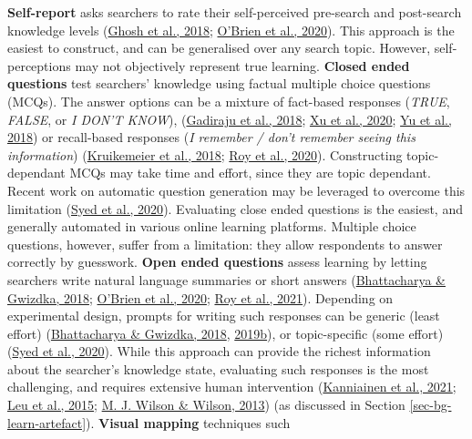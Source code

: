 \documentclass[letterpaper, nobind]{templates/ociamthesis}
\begin{document}
\textbf{Self-report} asks
searchers to rate their self-perceived pre-search and post-search
knowledge levels (\protect\hyperlink{ref-ghosh2018SearchingLearningExploring}{Ghosh et al., 2018}; \protect\hyperlink{ref-o2020role}{O'Brien et al., 2020}).
This approach is the easiest to construct, and can be generalised over
any search topic. However, self-perceptions may not objectively
represent true learning. \textbf{Closed ended questions} test searchers'
knowledge using factual multiple choice questions (MCQs). The answer
options can be a mixture of fact-based responses (\emph{TRUE}, \emph{FALSE}, or \emph{I
DON'T KNOW}),
(\protect\hyperlink{ref-gadiraju2018AnalyzingKnowledgeGain}{Gadiraju et al., 2018}; \protect\hyperlink{ref-xu2020does}{Xu et al., 2020}; \protect\hyperlink{ref-yu2018PredictingUserKnowledgea}{Yu et al., 2018})
or recall-based responses (\emph{I remember / don't remember seeing this
information}) (\protect\hyperlink{ref-kruikemeier2018learning}{Kruikemeier et al., 2018}; \protect\hyperlink{ref-roy2020exploring}{Roy et al., 2020}).
Constructing topic-dependant MCQs may take time and effort, since they
are topic dependant. Recent work on automatic question generation may be
leveraged to overcome this limitation (\protect\hyperlink{ref-syed2020improving}{Syed et al., 2020}). Evaluating
close ended questions is the easiest, and generally automated in various
online learning platforms. Multiple choice questions, however, suffer
from a limitation: they allow respondents to answer correctly by
guesswork. \textbf{Open ended questions} assess learning by letting searchers
write natural language summaries or short answers
(\protect\hyperlink{ref-bhattacharya2018relating}{Bhattacharya \& Gwizdka, 2018}; \protect\hyperlink{ref-o2020role}{O'Brien et al., 2020}; \protect\hyperlink{ref-roy2021note}{Roy et al., 2021}). Depending on
experimental design, prompts for writing such responses can be generic
(least effort) (\protect\hyperlink{ref-bhattacharya2018relating}{Bhattacharya \& Gwizdka, 2018}, \protect\hyperlink{ref-bhattacharya2019measuring}{2019b}),
or topic-specific (some effort) (\protect\hyperlink{ref-syed2020improving}{Syed et al., 2020}). While this
approach can provide the richest information about the searcher's
knowledge state, evaluating such responses is the most challenging, and
requires extensive human intervention
(\protect\hyperlink{ref-kanniainen2021assessing}{Kanniainen et al., 2021}; \protect\hyperlink{ref-leu2015new}{Leu et al., 2015}; \protect\hyperlink{ref-wilson2013comparison}{M. J. Wilson \& Wilson, 2013}) (as
discussed in Section \ref{sec-bg-learn-artefact}). \textbf{Visual mapping} techniques such
\end{document}
